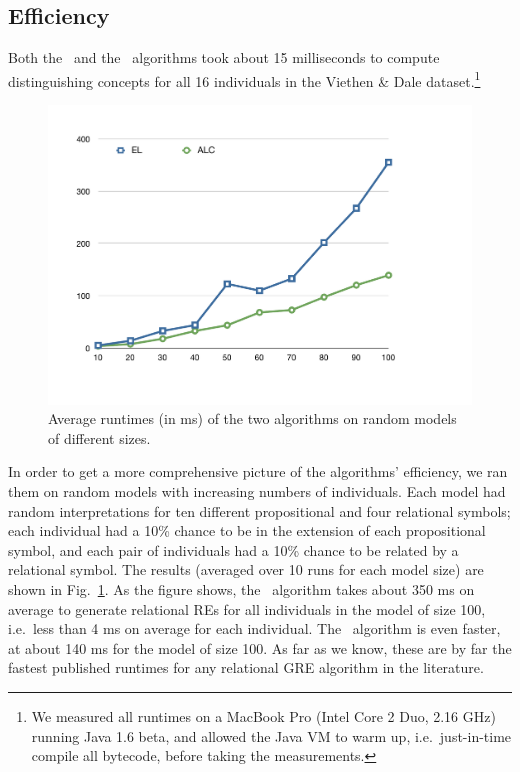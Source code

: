 



\subsection{Efficiency}

Both the \el\ and the \alc\ algorithms took about 15 milliseconds to
compute distinguishing concepts for all 16 individuals in the Viethen
\& Dale dataset.\footnote{We measured all runtimes on a MacBook Pro
  (Intel Core 2 Duo, 2.16 GHz) running Java 1.6 beta, and allowed the
  Java VM to warm up, i.e.\ just-in-time compile all bytecode, before
  taking the measurements.}

\begin{figure}
  \centering
  \includegraphics[width=\columnwidth]{runtimes}
  \caption{Average runtimes (in ms) of the two algorithms on random
    models of     different sizes.} 
  \label{fig:runtimes}
\end{figure}

In order to get a more comprehensive picture of the algorithms'
efficiency, we ran them on random models with increasing numbers of
individuals.  Each model had random interpretations for ten different
propositional and four relational symbols; each individual had a 10\%
chance to be in the extension of each propositional symbol, and each
pair of individuals had a 10\% chance to be related by a relational
symbol.  The results (averaged over 10 runs for each model size) are
shown in Fig.~\ref{fig:runtimes}.  As the figure shows, the \el\
algorithm takes about 350 ms on average to generate relational REs for
all individuals in the model of size 100, i.e.\ less than 4 ms on
average for each individual.  The \alc\ algorithm is even faster, at
about 140 ms for the model of size 100.  As far as we know, these are
by far the fastest published runtimes for any relational GRE algorithm
in the literature.

